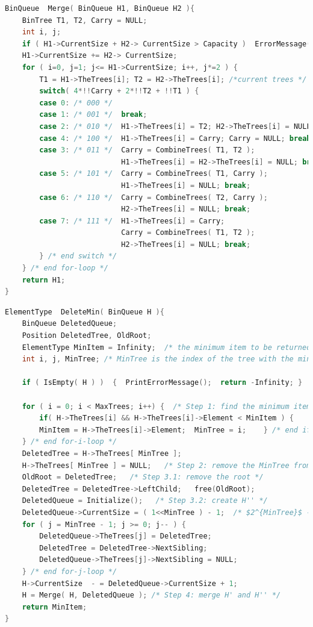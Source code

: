\documentclass{article}
\begin{document}
\begin{lstlisting}[language={c},title={Merge}]
BinQueue  Merge( BinQueue H1, BinQueue H2 ){
    BinTree T1, T2, Carry = NULL; 	
    int i, j;
    if ( H1->CurrentSize + H2-> CurrentSize > Capacity )  ErrorMessage();
    H1->CurrentSize += H2-> CurrentSize;
    for ( i=0, j=1; j<= H1->CurrentSize; i++, j*=2 ) {
        T1 = H1->TheTrees[i]; T2 = H2->TheTrees[i]; /*current trees */
        switch( 4*!!Carry + 2*!!T2 + !!T1 ) { 
        case 0: /* 000 */
        case 1: /* 001 */  break;	
        case 2: /* 010 */  H1->TheTrees[i] = T2; H2->TheTrees[i] = NULL; break;
        case 4: /* 100 */  H1->TheTrees[i] = Carry; Carry = NULL; break;
        case 3: /* 011 */  Carry = CombineTrees( T1, T2 );
                           H1->TheTrees[i] = H2->TheTrees[i] = NULL; break;
        case 5: /* 101 */  Carry = CombineTrees( T1, Carry );
                           H1->TheTrees[i] = NULL; break;
        case 6: /* 110 */  Carry = CombineTrees( T2, Carry );
                           H2->TheTrees[i] = NULL; break;
        case 7: /* 111 */  H1->TheTrees[i] = Carry; 
                           Carry = CombineTrees( T1, T2 ); 
                           H2->TheTrees[i] = NULL; break;
        } /* end switch */
    } /* end for-loop */
    return H1;
}
\end{lstlisting}

\begin{lstlisting}[language={c},title={DeleteMin},mathescape]
ElementType  DeleteMin( BinQueue H ){
    BinQueue DeletedQueue; 
    Position DeletedTree, OldRoot;
    ElementType MinItem = Infinity;  /* the minimum item to be returned */	
    int i, j, MinTree; /* MinTree is the index of the tree with the minimum item */

    if ( IsEmpty( H ) )  {  PrintErrorMessage();  return -Infinity; }

    for ( i = 0; i < MaxTrees; i++) {  /* Step 1: find the minimum item */
        if( H->TheTrees[i] && H->TheTrees[i]->Element < MinItem ) { 
        MinItem = H->TheTrees[i]->Element;  MinTree = i;    } /* end if */
    } /* end for-i-loop */
    DeletedTree = H->TheTrees[ MinTree ];  
    H->TheTrees[ MinTree ] = NULL;   /* Step 2: remove the MinTree from H => H' */ 
    OldRoot = DeletedTree;   /* Step 3.1: remove the root */ 
    DeletedTree = DeletedTree->LeftChild;   free(OldRoot);
    DeletedQueue = Initialize();   /* Step 3.2: create H'' */ 
    DeletedQueue->CurrentSize = ( 1<<MinTree ) - 1;  /* $2^{MinTree}$ - 1 */
    for ( j = MinTree - 1; j >= 0; j-- ) {  
        DeletedQueue->TheTrees[j] = DeletedTree;
        DeletedTree = DeletedTree->NextSibling;
        DeletedQueue->TheTrees[j]->NextSibling = NULL;
    } /* end for-j-loop */
    H->CurrentSize  - = DeletedQueue->CurrentSize + 1;
    H = Merge( H, DeletedQueue ); /* Step 4: merge H' and H'' */ 
    return MinItem;
}
\end{lstlisting}
\end{document}
